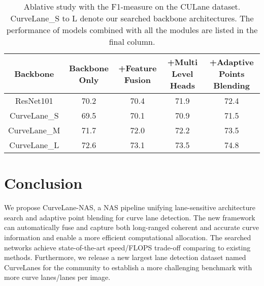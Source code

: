 \documentclass[runningheads]{llncs}
\providecommand{\tabularnewline}{\\}
\begin{document}
\begin{table}[tb]

\caption{\label{tab:Ablative-Study-onNMS}Ablative study with the F1-measure
on the CULane dataset. CurveLane\_S to L denote our searched backbone
architectures. The performance of models combined with all the modules
are listed in the final column.}



\begin{centering}
{\scriptsize{}}\tabcolsep 0.02in{\scriptsize{}}\begin{tabular}{c|c|c|c|c}
\hline 
{\scriptsize{}Backbone} & {\scriptsize{}Backbone Only} & {\scriptsize{}+Feature Fusion} & {\scriptsize{}+Multi Level Heads} & {\scriptsize{}+Adaptive Points Blending}\tabularnewline
\hline 
{\scriptsize{}ResNet101} & {\scriptsize{}70.2} & {\scriptsize{}70.4} & {\scriptsize{}71.9} & {\scriptsize{}72.4}\tabularnewline
{\scriptsize{}CurveLane\_S} & {\scriptsize{}69.5} & {\scriptsize{}70.1} & {\scriptsize{}70.9} & {\scriptsize{}71.5}\tabularnewline
{\scriptsize{}CurveLane\_M} & {\scriptsize{}71.7} & {\scriptsize{}72.0} & {\scriptsize{}72.2} & {\scriptsize{}73.5}\tabularnewline
{\scriptsize{}CurveLane\_L} & {\scriptsize{}72.6} & {\scriptsize{}73.1} & {\scriptsize{}73.5} & {\scriptsize{}74.8}\tabularnewline
\hline 
\end{tabular}{\scriptsize\par}
\par\end{centering}

\end{table}


\section{Conclusion}

We propose CurveLane-NAS, a NAS pipeline unifying lane-sensitive architecture
search and adaptive point blending for curve lane detection. The new
framework can automatically fuse and capture both long-ranged coherent
and accurate curve information and enable a more efficient computational
allocation. The searched networks achieve state-of-the-art speed/FLOPS
trade-off comparing to existing methods. Furthermore, we release a
new largest lane detection dataset named CurveLanes for the community
to establish a more challenging benchmark with more curve lanes/lanes per image. 



 
\end{document}
